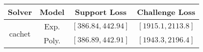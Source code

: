 \begin{tabular}{cc|c|c} 
\hline 
 Solver & Model & Support Loss  & Challenge Loss \tabularnewline\hline 
\hline 
\multirow{2}{*}{cachet} & Exp. & $\left[386.84,442.94\right]$ & $\left[1915.1,2113.8\right]$ \tabularnewline 
 & Poly. & $\left[386.89,442.91\right]$ & $\left[1943.3,2196.4\right]$ \tabularnewline 
\hline 
\end{tabular} 

